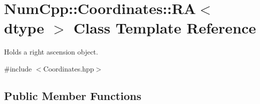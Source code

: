 \hypertarget{class_num_cpp_1_1_coordinates_1_1_r_a}{}\section{Num\+Cpp\+:\+:Coordinates\+:\+:RA$<$ dtype $>$ Class Template Reference}
\label{class_num_cpp_1_1_coordinates_1_1_r_a}


Holds a right ascension object.  




{\ttfamily \#include $<$Coordinates.\+hpp$>$}

\subsection*{Public Member Functions}
